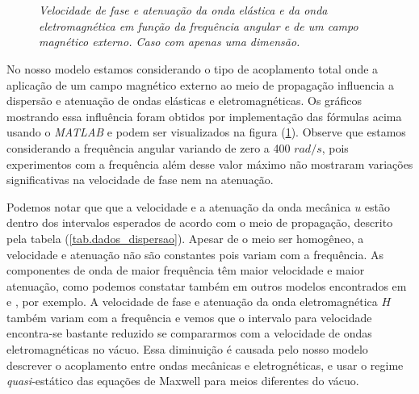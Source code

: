 
\begin{figure}
\centering
{}
\\
\\
\caption{\textit{Velocidade de fase e atenua\c{c}\~ao da onda el\'astica e da onda eletromagn\'etica em fun\c{c}\~ao da frequ\^encia angular e de um campo magn\'etico externo. Caso com apenas uma dimens\~ao.}}
\label{fig.disp_1D}
\end{figure}

No nosso modelo estamos considerando o tipo de acoplamento total onde a aplica\c{c}\~ao de um campo magn\'etico externo ao meio de propaga\c{c}\~ao influencia a dispers\~ao e atenua\c{c}\~ao de ondas el\'asticas e eletromagn\'eticas. Os gr\'aficos mostrando essa influ\^encia foram obtidos por implementa\c{c}\~ao das f\'ormulas acima usando o \textit{MATLAB} e podem ser visualizados na figura (\ref{fig.disp_1D}). Observe que estamos considerando a frequ\^encia angular variando de zero a 400 $rad/s$, pois experimentos com a frequ\^encia al\'em desse valor m\'aximo n\~ao mostraram varia\c{c}\~oes significativas na velocidade de fase nem na atenua\c{c}\~ao. 

Podemos notar que que a velocidade e a atenua\c{c}\~ao da onda mec\^anica $u$ est\~ao dentro dos intervalos esperados de acordo com o meio de propaga\c{c}\~ao, descrito pela tabela (\ref{tab.dados_dispersao}). Apesar de o meio ser homog\^eneo, a velocidade e atenua\c{c}\~ao n\~ao s\~ao constantes pois variam com a frequ\^encia. As componentes de onda de maior frequ\^encia t\^em maior velocidade e maior atenua\c{c}\~ao, como podemos constatar tamb\'em em outros modelos encontrados em \cite{oliveira_2018} e \cite{miranda_2016}, por exemplo. A velocidade de fase e atenua\c{c}\~ao da onda eletromagn\'etica $H$ tamb\'em variam com a frequ\^encia e vemos que o intervalo para velocidade encontra-se bastante reduzido se compararmos com a velocidade de ondas eletromagn\'eticas no v\'acuo. Essa diminui\c{c}\~ao \'e causada pelo nosso modelo descrever o acoplamento entre ondas mec\^anicas e eletrogn\'eticas, e usar o regime \textit{quasi}-est\'atico das equa\c{c}\~oes de Maxwell para meios diferentes do v\'acuo.\\

